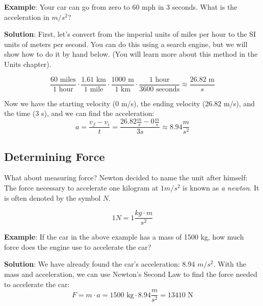 \textbf{Example}: Your car can go from zero to 60 mph in 3 seconds. What is the
acceleration in $m / s^2$?

\textbf{Solution}: First, let's convert from the imperial units of miles per
hour to the SI units of meters per second. You can do this using a search engine, 
but we will show how to do it by hand below. (You will learn more about this 
method in the Units chapter).

$$\frac{60 \text{ miles}}{1 \text{ hour}} \cdot \frac{1.61 \text{ km}}{1 
\text{ mile}} \cdot \frac{1000\text{ m}}{1\text{ km}} \cdot \frac{1\text{ hour}}{
3600\text{ seconds}} \approx \frac{26.82\text{ m}}{s}$$

Now we have the starting velocity (0 m/s), the ending velocity (26.82 m/s), and 
the time (3 s), and we can find the acceleration:
$$a = \frac{v_f - v_i}{t} = \frac{26.82\frac{m}{s} - 0\frac{m}{s}}{3s} \approx 
8.94 \frac{m}{s^2}$$

\subsection{Determining Force}
What about measuring force? Newton decided to name the unit after himself: The
force necessary to accelerate one kilogram at $1 m/s^2$ is known as \textit{a
newton}. It is often denoted by the symbol $N$.

$$1 N = 1 \frac{kg \cdot m}{s^2}$$

\textbf{Example}: If the car in the above example has a mass of 1500 kg, how much 
force does the engine use to accelerate the car?

\textbf{Solution}: We have already found the car's acceleration: 8.94 $m/s^2$. 
With the mass and acceleration, we can use Newton's Second Law to find the force 
needed to accelerate the car:
$$F = m \cdot a = 1500\text{ kg} \cdot 8.94 \frac{m}{s^2} = 13410\text{ N}$$

